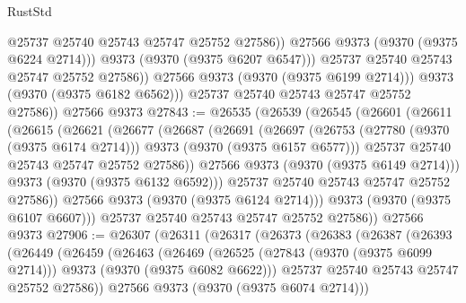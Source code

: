 \begin{lexlean}{RustStd}
\begin{coremodule}
{\begin{coremodule}
{{{{{{{{{{{{{{{{{{{{{{{{{{{{{{{{{{{{{{{                        @25737
                        @25740
                        @25743
                        @25747
                        @25752
                        @27586))
                    @27566
                    @9373
                    (@9370 (@9375 @6224 @2714)))
                  @9373
                  (@9370 (@9375 @6207 @6547)))
                @25737
                @25740
                @25743
                @25747
                @25752
                @27586))
            @27566
            @9373
            (@9370 (@9375 @6199 @2714)))
          @9373
          (@9370 (@9375 @6182 @6562)))
        @25737
        @25740
        @25743
        @25747
        @25752
        @27586))
    @27566
    @9373
@27843 := @26535
    (@26539
      (@26545
        (@26601
          (@26611
            (@26615
              (@26621
                (@26677
                  (@26687
                    (@26691
                      (@26697
                        (@26753
                          (@27780 (@9370 (@9375 @6174 @2714)))
                          @9373
                          (@9370 (@9375 @6157 @6577)))
                        @25737
                        @25740
                        @25743
                        @25747
                        @25752
                        @27586))
                    @27566
                    @9373
                    (@9370 (@9375 @6149 @2714)))
                  @9373
                  (@9370 (@9375 @6132 @6592)))
                @25737
                @25740
                @25743
                @25747
                @25752
                @27586))
            @27566
            @9373
            (@9370 (@9375 @6124 @2714)))
          @9373
          (@9370 (@9375 @6107 @6607)))
        @25737
        @25740
        @25743
        @25747
        @25752
        @27586))
    @27566
    @9373
@27906 := @26307
    (@26311
      (@26317
        (@26373
          (@26383
            (@26387
              (@26393
                (@26449
                  (@26459
                    (@26463
                      (@26469
                        (@26525
                          (@27843 (@9370 (@9375 @6099 @2714)))
                          @9373
                          (@9370 (@9375 @6082 @6622)))
                        @25737
                        @25740
                        @25743
                        @25747
                        @25752
                        @27586))
                    @27566
                    @9373
                    (@9370 (@9375 @6074 @2714)))
}}}}}}}}}}}}}}}}}}}}}}}}}}}}}}}}}}}}}}}
\end{coremodule}}
\end{coremodule}
\end{lexlean}
